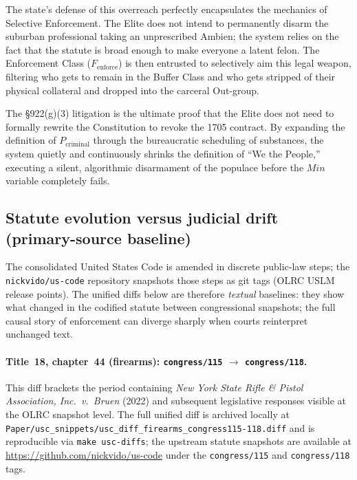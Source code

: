 The state's defense of this overreach perfectly encapsulates the mechanics of Selective Enforcement. The Elite does not intend to permanently disarm the suburban professional taking an unprescribed Ambien; the system relies on the fact that the statute is broad enough to make everyone a latent felon. The Enforcement Class ($F_{\text{enforce}}$) is then entrusted to selectively aim this legal weapon, filtering who gets to remain in the Buffer Class and who gets stripped of their physical collateral and dropped into the carceral Out-group.

The \S922(g)(3) litigation is the ultimate proof that the Elite does not need to formally rewrite the Constitution to revoke the 1705 contract. By expanding the definition of $P_{\text{criminal}}$ through the bureaucratic scheduling of substances, the system quietly and continuously shrinks the definition of ``We the People,'' executing a silent, algorithmic disarmament of the populace before the $Min$ variable completely fails.

\subsection{Statute evolution versus judicial drift (primary-source baseline)}
\label{sec:statute_evolution_usc}

The consolidated United States Code is amended in discrete public-law steps; the \texttt{nickvido/us-code} repository snapshots those steps as git tags (OLRC USLM release points). The unified diffs below are therefore \emph{textual} baselines: they show what changed in the codified statute between congressional snapshots; the full causal story of enforcement can diverge sharply when courts reinterpret unchanged text.

\paragraph{Title~18, chapter~44 (firearms): \texttt{congress/115} $\rightarrow$ \texttt{congress/118}.}
This diff brackets the period containing \textit{New York State Rifle \& Pistol Association, Inc.\ v.\ Bruen} (2022) and subsequent legislative responses visible at the OLRC snapshot level. The full unified diff is archived locally at \texttt{Paper/usc\_snippets/usc\_diff\_firearms\_congress115-118.diff} and is reproducible via \texttt{make usc-diffs}; the upstream statute snapshots are available at \url{https://github.com/nickvido/us-code} under the \texttt{congress/115} and \texttt{congress/118} tags.

